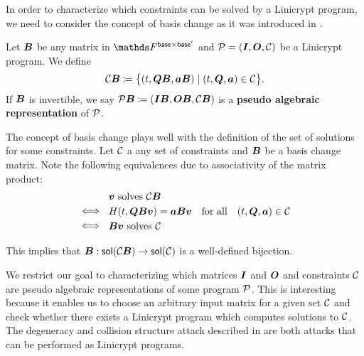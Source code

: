 In order to characterize which constraints can be solved by a Linicrypt program,
we need to consider the concept of basis change as it was introduced in \cite{C:CarRos16}.

\begin{defn}
    Let $\v B$ be any matrix in $\F^{\base \times \base'}$
    and $\P = (\Inp, \O, \C)$ be a Linicrypt program.
    We define 
    \[
        \C \B \coloneqq \big\{ (t, \Q \B, \va \B) \mid (t, \Q, \va) \in \C \big\}.
    \]
    If $\B$ is invertible,
    we say $\P\B \coloneqq (\Inp \B, \O \B, \C \B)$ is a \textbf{pseudo algebraic representation} of $\P$.
\end{defn}

The concept of basis change plays well with the definition of the set of solutions for some constraints.
Let $\C$ a any set of constraints and $\B$ be a basis change matrix.
Note the following equivalences due to associativity of the matrix product:
\begin{align*}
&\parbox{30pt}{\phantom{$\iff$}} \vv \textrm{ solves } \C\B \\
&\parbox{30pt}{$\iff$} \H(t, \Q \B \vv) = \va \B \vv \quad \textrm{for all} \quad (t, \Q, \va) \in \C \\
&\parbox{30pt}{$\iff$} \B \vv \textrm{ solves } \C
\end{align*}

This implies that $\B: \sol(\C\B) \to \sol(\C)$ is a well-defined bijection.

We restrict our goal to characterizing which matrices $\I$ and $\O$ and constraints $\C$ are pseudo algebraic representations of some program $\P$. 
This is interesting because it enables us to choose an arbitrary input matrix for a given set $\C$ and check whether there exists a Linicrypt program which computes solutions to $\C$.
The degeneracy and collision structure attack described in \cite{TCC:McQSwoRos19} are both attacks that can be performed as Linicrypt programs.

